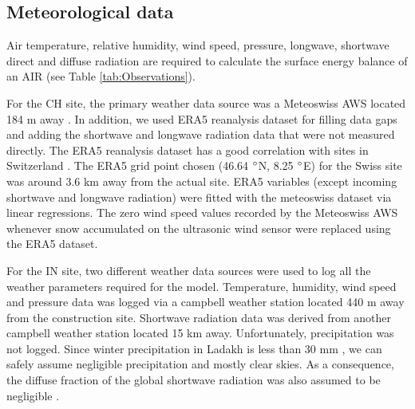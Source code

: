 \documentclass[utf8]{frontiersSCNS}
\begin{document}
\subsection{Meteorological data}

Air temperature, relative humidity, wind speed, pressure, longwave, shortwave direct and diffuse radiation are
required to calculate the surface energy balance of an AIR (see Table \ref{tab:Observations}).

For the CH site, the primary weather data source was a Meteoswiss AWS located 184 m away . In addition, we used ERA5 reanalysis dataset \citep{era5} for filling data gaps and
adding the shortwave and longwave radiation data that were not measured directly.  The ERA5 reanalysis dataset
has a good correlation with sites in Switzerland \citep{Scherrer_2020}. The ERA5 grid point
chosen (46.64 $\degree$N, 8.25 $\degree$E) for the Swiss site was around 3.6 km away from the actual site. ERA5
variables (except incoming shortwave and longwave radiation) were fitted with the meteoswiss dataset via linear
regressions. The zero wind speed values recorded by the Meteoswiss AWS whenever snow accumulated on the
ultrasonic wind sensor were replaced using the ERA5 dataset.

For the IN site, two different weather data sources were used to log all the weather parameters required for the
model. Temperature, humidity, wind speed and pressure data was logged via a campbell weather station located 440
m away from the construction site. Shortwave radiation data was derived from another campbell weather station
located 15 km away. Unfortunately, precipitation was not logged. Since winter precipitation in Ladakh is less
than 30 mm \citep{Nusser_2012}, we can safely assume negligible precipitation and mostly clear skies. As a
consequence, the diffuse fraction of the global shortwave radiation was also assumed to be negligible .
\end{document}
